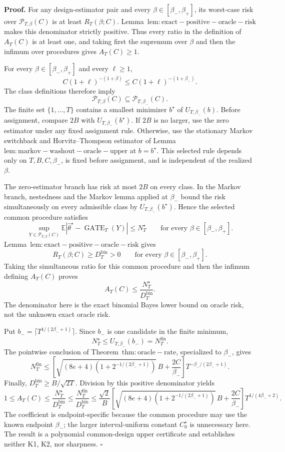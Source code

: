 \textbf{Proof.} For any design-estimator pair and every \(\beta\in[\beta_-,\beta_+]\), its worst-case risk over \(\mathcal P_{T,\beta}(C)\) is at least \(R_T(\beta;C)\). Lemma~\(\mathrm{lem:exact-positive-oracle-risk}\) makes this denominator strictly positive. Thus every ratio in the definition of \(A_T(C)\) is at least one, and taking first the supremum over \(\beta\) and then the infimum over procedures gives \(A_T(C)\ge1\).

For every \(\beta\in[\beta_-,\beta_+]\) and every \(\ell\ge1\),
\[
C(1+\ell)^{-(1+\beta)}\le C(1+\ell)^{-(1+\beta_-)}.
\]
The class definitions therefore imply
\[
\mathcal P_{T,\beta}(C)\subseteq\mathcal P_{T,\beta_-}(C).
\]
The finite set \(\{1,\ldots,T\}\) contains a smallest minimizer \(b^\star\) of \(U_{T,\beta_-}(b)\). Before assignment, compare \(2B\) with \(U_{T,\beta_-}(b^\star)\). If \(2B\) is no larger, use the zero estimator under any fixed assignment rule. Otherwise, use the stationary Markov switchback and Horvitz--Thompson estimator of Lemma~\(\mathrm{lem:markov-washout-oracle-upper}\) at \(b=b^\star\). This selected rule depends only on \(T,B,C,\beta_-\), is fixed before assignment, and is independent of the realized \(\beta\).

The zero-estimator branch has risk at most \(2B\) on every class. In the Markov branch, nestedness and the Markov lemma applied at \(\beta_-\) bound the risk simultaneously on every admissible class by \(U_{T,\beta_-}(b^\star)\). Hence the selected common procedure satisfies
\[
\sup_{Y\in\mathcal P_{T,\beta}(C)}
\mathbb E\left|\widehat\theta^\star-\operatorname{GATE}_T(Y)\right|
\le N_T^\star
\qquad\text{for every }\beta\in[\beta_-,\beta_+].
\]
Lemma~\(\mathrm{lem:exact-positive-oracle-risk}\) gives
\[
R_T(\beta;C)\ge D_T^{\mathrm{bin}}>0
\qquad\text{for every }\beta\in[\beta_-,\beta_+].
\]
Taking the simultaneous ratio for this common procedure and then the infimum defining \(A_T(C)\) proves
\[
A_T(C)\le\frac{N_T^\star}{D_T^{\mathrm{bin}}}.
\]
The denominator here is the exact binomial Bayes lower bound on oracle risk, not the unknown exact oracle risk.

Put \(b_-=\lceil T^{1/(2\beta_-+1)}\rceil\). Since \(b_-\) is one candidate in the finite minimum,
\[
N_T^\star\le U_{T,\beta_-}(b_-)=N_T^{\mathrm{fin}}.
\]
The pointwise conclusion of Theorem~\(\mathrm{thm:oracle-rate}\), specialized to \(\beta_-\), gives
\[
N_T^{\mathrm{fin}}
\le
\left[\sqrt{(8e+4)\left(1+2^{-1/(2\beta_-+1)}\right)}\,B+\frac{2C}{\beta_-}\right]
T^{-\beta_-/(2\beta_-+1)}.
\]
Finally, \(D_T^{\mathrm{bin}}\ge B/\sqrt{2T}\). Division by this positive denominator yields
\[
1\le A_T(C)
\le\frac{N_T^\star}{D_T^{\mathrm{bin}}}
\le\frac{N_T^{\mathrm{fin}}}{D_T^{\mathrm{bin}}}
\le\frac{\sqrt2}{B}
\left[\sqrt{(8e+4)\left(1+2^{-1/(2\beta_-+1)}\right)}\,B+\frac{2C}{\beta_-}\right]
T^{1/(4\beta_-+2)}.
\]
The coefficient is endpoint-specific because the common procedure may use the known endpoint \(\beta_-\); the larger interval-uniform constant \(C_0^\star\) is unnecessary here. The result is a polynomial common-design upper certificate and establishes neither K1, K2, nor sharpness. \(\square\)
